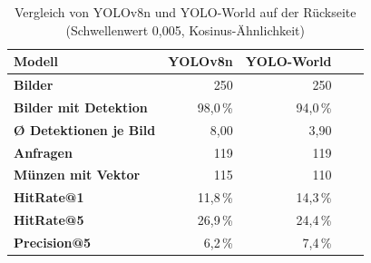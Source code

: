 \begin{table}[H]
\centering
\caption{Vergleich von YOLOv8n und YOLO-World auf der Rückseite (Schwellenwert 0{,}005, Kosinus-Ähnlichkeit)}
\label{tab:modelle_rueckseite}
\begin{tabular}{|l|r|r|r|r|}
\hline
\textbf{Modell} & \textbf{YOLOv8n} & \textbf{YOLO-World} \\ \hline \hline
\textbf{Bilder}                     & 250 & 250 \\ \hline
\textbf{Bilder mit Detektion}       & 98{,}0\,\% & 94{,}0\,\% \\ \hline
\textbf{Ø Detektionen je Bild}      & 8{,}00 & 3{,}90 \\ \hline
\textbf{Anfragen}                   & 119 & 119 \\ \hline
\textbf{Münzen mit Vektor}          & 115 & 110 \\ \hline
\textbf{HitRate@1}                  & 11{,}8\,\% & 14{,}3\,\% \\ \hline
\textbf{HitRate@5}                  & 26{,}9\,\% & 24{,}4\,\% \\ \hline
\textbf{Precision@5}                & 6{,}2\,\% & 7{,}4\,\% \\ \hline
\end{tabular}
\end{table}